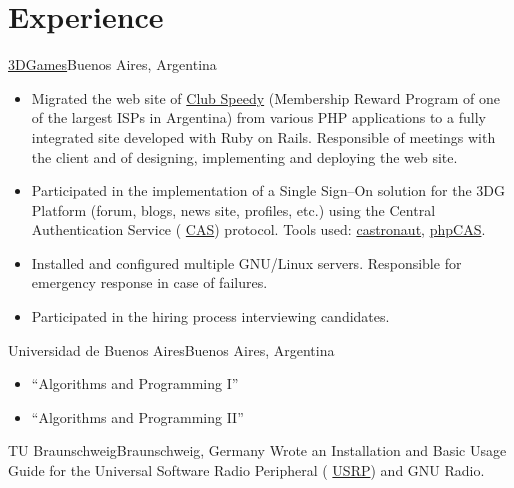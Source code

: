 \documentclass[11pt,a4paper]{moderncv}
\newcommand\weblink[2] {{\color{href} \href{#1}{#2}}}
\begin{document}
\section{Experience}
{\weblink{http://www.3dgames.com.ar}{3DGames}}{Buenos Aires, Argentina}{}{%
\begin{itemize}
  \item Migrated the web site of \weblink{http://club.speedy.com.ar}{Club
    Speedy} (Membership Reward Program of one of the largest ISPs in Argentina)
    from various PHP applications to a fully integrated site developed with
    Ruby on Rails. Responsible of meetings with the client and of designing,
    implementing and deploying the web site.
  \item Participated in the implementation of a Single Sign--On solution for
    the 3DG Platform (forum, blogs, news site, profiles, etc.) using the
    Central Authentication Service
    (\weblink{http://en.wikipedia.org/wiki/Central_Authentication_Service}{CAS})
    protocol. Tools used:
    \weblink{https://github.com/relevance/castronaut}{castronaut},
    \weblink{https://wiki.jasig.org/display/CASC/phpCAS}{phpCAS}.
  \item Installed and configured multiple GNU/Linux servers. Responsible for
    emergency response in case of failures.
  \item Participated in the hiring process interviewing candidates.
\end{itemize}
}
%
{Universidad de Buenos Aires}{Buenos Aires, Argentina}{}{%
\begin{itemize}%
  \item ``Algorithms and Programming I''
  \item ``Algorithms and Programming II''
\end{itemize}
}
%
{TU Braunschweig}{Braunschweig, Germany}{}{%
Wrote an Installation and Basic Usage Guide for the Universal Software Radio
Peripheral (\weblink{http://www.ettus.com/products}{USRP\texttrademark}) and
GNU Radio.
}
%
\end{document}
